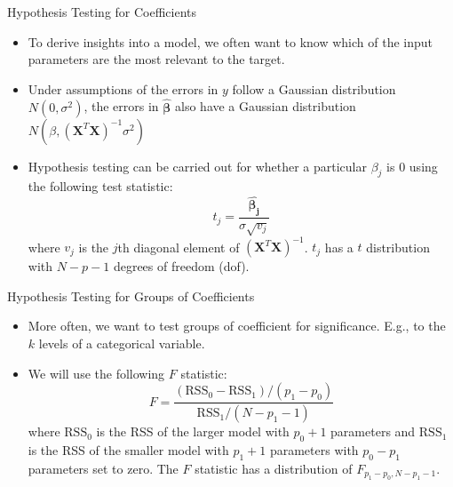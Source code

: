 \documentclass{beamer}
\let \vec \mathbf
\begin{document}
\begin{frame}{Hypothesis Testing for Coefficients}
    \begin{itemize}
        \item To derive insights into a model, we often want to know which of the input parameters are the most relevant to the target.
        \item Under assumptions of the errors in $y$ follow a Gaussian distribution $N(0, \sigma^2)$, the errors in $\hat{\bm{\beta}}$ also have a Gaussian distribution $N(\beta, (\vec{X}^T \vec{X})^{-1} \sigma^2)$
        \item Hypothesis testing can be carried out for whether a particular $\beta_j$ is 0 using the following test statistic:
        \begin{equation*}
        t_j = \frac{\hat{\bm{\beta_j}}}{\sigma\sqrt{v_j}}
        \end{equation*}
        where $v_j$ is the $j$th diagonal element of $(\vec{X}^T \vec{X})^{-1}$. $t_j$ has a $t$ distribution with $N-p-1$ degrees of freedom (dof).
    \end{itemize}
\end{frame} 


\begin{frame}{Hypothesis Testing for Groups of Coefficients}
    \begin{itemize}
        \item More often, we want to test groups of coefficient for significance. E.g., to the $k$ levels of a categorical variable.
        \item We will use the following $F$ statistic:
        \begin{equation*}
        F = \frac{(\mathrm{RSS}_0 - \mathrm{RSS}_1)/(p_1-p_0)}{\mathrm{RSS}_1/(N-p_1-1)}
        \end{equation*}
        where $\mathrm{RSS}_0$ is the RSS of the larger model with $p_0 + 1$ parameters and $\mathrm{RSS}_1$ is the RSS of the smaller model with $p_1 + 1$ parameters with $p_0 - p_1$ parameters set to zero. The $F$ statistic has a distribution of $F_{p_1-p_0,N-p_1-1}$.
    \end{itemize}
\end{frame} 
\end{document}
